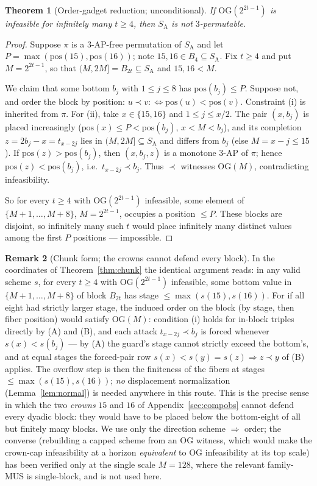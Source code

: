 \documentclass[11pt]{article}
\newtheorem{theorem}{Theorem}
\theoremstyle{definition}
\newtheorem{remark}[theorem]{Remark}
\newcommand{\SA}{S_{\mathrm{A}}}
\newcommand{\pos}{\mathrm{pos}}
\newcommand{\OG}{\mathrm{OG}}
\begin{document}
\begin{theorem}[Order-gadget reduction; unconditional]\label{thm:ogred}
If $\OG(2^{2t-1})$ is infeasible for infinitely many $t \ge 4$, then
$\SA$ is not $3$-permutable.
\end{theorem}

\begin{proof}
Suppose $\pi$ is a $3$-AP-free permutation of $\SA$ and let
$P = \max(\pos(15), \pos(16))$; note $15, 16 \in B_4 \subseteq \SA$. Fix
$t \ge 4$ and put $M = 2^{2t-1}$, so that $(M, 2M] = B_{2t} \subseteq
\SA$ and $15, 16 < M$.

We claim that some bottom $b_j$ with $1 \le j \le 8$ has
$\pos(b_j) \le P$. Suppose not, and order the block by position:
$u \prec v :\!\iff \pos(u) < \pos(v)$. Constraint (i) is inherited from
$\pi$. For (ii), take $x \in \{15, 16\}$ and $1 \le j \le x/2$. The pair
$(x, b_j)$ is placed increasingly ($\pos(x) \le P < \pos(b_j)$, $x < M <
b_j$), and its completion $z = 2b_j - x = t_{x-2j}$ lies in
$(M, 2M] \subseteq \SA$ and differs from $b_j$ (else $M = x - j \le
15$). If $\pos(z) > \pos(b_j)$, then $(x, b_j, z)$ is a monotone $3$-AP
of $\pi$; hence $\pos(z) < \pos(b_j)$, i.e.\ $t_{x-2j} \prec b_j$. Thus
$\prec$ witnesses $\OG(M)$, contradicting infeasibility.

So for every $t \ge 4$ with $\OG(2^{2t-1})$ infeasible, some element of
$\{M+1, \dots, M+8\}$, $M = 2^{2t-1}$, occupies a position $\le P$.
These blocks are disjoint, so infinitely many such $t$ would place
infinitely many distinct values among the first $P$ positions ---
impossible.
\end{proof}

\begin{remark}[Chunk form; the crowns cannot defend every block]
\label{rem:ogchunk}
In the coordinates of Theorem~\ref{thm:chunk} the identical argument
reads: in any valid scheme $s$, for every $t \ge 4$ with
$\OG(2^{2t-1})$ infeasible, some bottom value in
$\{M+1, \dots, M+8\}$ of block $B_{2t}$ has stage
$\le \max(s(15), s(16))$. For if all eight had strictly larger stage,
the induced order on the block (by stage, then fiber position) would
satisfy $\OG(M)$: condition (i) holds for in-block triples directly by
(A) and (B), and each attack $t_{x-2j} \prec b_j$ is forced whenever
$s(x) < s(b_j)$ --- by (A) the guard's stage cannot strictly exceed the
bottom's, and at equal stages the forced-pair row
$s(x) < s(y) = s(z) \Rightarrow z \prec y$ of (B) applies. The overflow
step is then the finiteness of the fibers at stages
$\le \max(s(15), s(16))$; \emph{no} displacement normalization
(Lemma~\ref{lem:normal}) is needed anywhere in this route. This is the
precise sense in which the two \emph{crowns} $15$ and $16$ of
Appendix~\ref{sec:compobs} cannot defend every dyadic block: they would
have to be placed below the bottom-eight of all but finitely many
blocks. We use only the direction scheme $\Rightarrow$ order; the
converse (rebuilding a capped scheme from an $\OG$ witness, which would
make the crown-cap infeasibility at a horizon \emph{equivalent} to
$\OG$ infeasibility at its top scale) has been verified only at the
single scale $M = 128$, where the relevant family-MUS is single-block,
and is not used here.
\end{remark}
\end{document}
